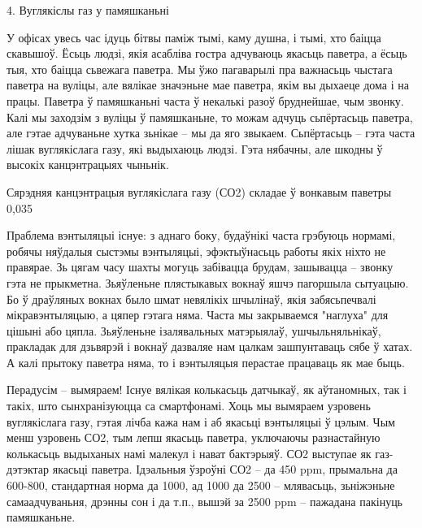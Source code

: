 4. Вуглякіслы газ у памяшканьні

У офісах увесь час ідуць бітвы паміж тымі, каму душна, і тымі, хто баіцца скавышоў. Ёсьць людзі, якія асабліва гостра адчуваюць якасьць паветра, а ёсьць тыя, хто баіцца сьвежага паветра. Мы ўжо пагаварылі пра важнасьць чыстага паветра на вуліцы, але вялікае значэньне мае паветра, якім вы дыхаеце дома і на працы. Паветра ў памяшканьні часта ў некалькі разоў бруднейшае, чым звонку. Калі мы заходзім з вуліцы ў памяшканьне, то можам адчуць сьпёртасьць паветра, але гэтае адчуваньне хутка зьнікае – мы да яго звыкаем. Сьпёртасьць – гэта часта лішак вуглякіслага газу, які выдыхаюць людзі. Гэта нябачны, але шкодны ў высокіх канцэнтрацыях чыньнік.

Сярэдняя канцэнтрацыя вуглякіслага газу (СО2) складае ў вонкавым паветры 0,035%

Праблема вэнтыляцыі існуе: з аднаго боку, будаўнікі часта грэбуюць нормамі, робячы няўдалыя сыстэмы вэнтыляцыі, эфэктыўнасьць работы якіх ніхто не правярае. Зь цягам часу шахты могуць забівацца брудам, зашывацца – звонку гэта не прыкметна. Зьяўленьне плястыкавых вокнаў яшчэ пагоршыла сытуацыю. Бо ў драўляных вокнах было шмат невялікіх шчылінаў, якія забясьпечвалі мікравэнтыляцыю, а цяпер гэтага няма. Часта мы закрываемся "наглуха" для цішыні або цяпла. Зьяўленьне ізалявальных матэрыялаў, ушчыльняльнікаў, пракладак для дзьвярэй і вокнаў дазваляе нам цалкам зашпунтаваць сябе ў хатах. А калі прытоку паветра няма, то і вэнтыляцыя перастае працаваць як мае быць.

Перадусім – вымяраем! Існуе вялікая колькасьць датчыкаў, як аўтаномных, так і такіх, што сынхранізуюцца са смартфонамі. Хоць мы вымяраем узровень вуглякіслага газу, гэтая лічба кажа нам і аб якасьці вэнтыляцыі ў цэлым. Чым менш узровень СО2, тым лепш якасьць паветра, уключаючы разнастайную колькасьць выдыханых намі малекул і нават бактэрыяў. СО2 выступае як газ-дэтэктар якасьці паветра. Ідэальныя ўзроўні СО2 – да 450 ppm, прымальна да 600-800, стандартная норма да 1000, ад 1000 да 2500 – млявасьць, зьніжэньне самаадчуваньня, дрэнны сон і да т.п., вышэй за 2500 ppm – пажадана пакінуць памяшканьне.

